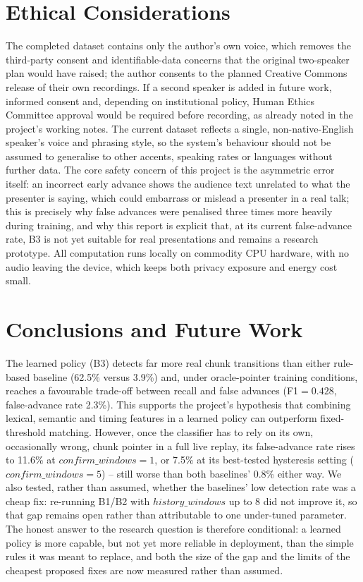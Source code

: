 \documentclass[conference,a4paper]{IEEEtran}
\begin{document}
\section{Ethical Considerations}
The completed dataset contains only the author's own voice, which removes the third-party consent and identifiable-data concerns that the original two-speaker plan would have raised; the author consents to the planned Creative Commons release of their own recordings. If a second speaker is added in future work, informed consent and, depending on institutional policy, Human Ethics Committee approval would be required before recording, as already noted in the project's working notes. The current dataset reflects a single, non-native-English speaker's voice and phrasing style, so the system's behaviour should not be assumed to generalise to other accents, speaking rates or languages without further data. The core safety concern of this project is the asymmetric error itself: an incorrect early advance shows the audience text unrelated to what the presenter is saying, which could embarrass or mislead a presenter in a real talk; this is precisely why false advances were penalised three times more heavily during training, and why this report is explicit that, at its current false-advance rate, B3 is not yet suitable for real presentations and remains a research prototype. All computation runs locally on commodity CPU hardware, with no audio leaving the device, which keeps both privacy exposure and energy cost small.

\section{Conclusions and Future Work}
\label{sec:conclusion}
The learned policy (B3) detects far more real chunk transitions than either rule-based baseline (62.5\% versus 3.9\%) and, under oracle-pointer training conditions, reaches a favourable trade-off between recall and false advances (F1\(=0.428\), false-advance rate 2.3\%). This supports the project's hypothesis that combining lexical, semantic and timing features in a learned policy can outperform fixed-threshold matching. However, once the classifier has to rely on its own, occasionally wrong, chunk pointer in a full live replay, its false-advance rate rises to 11.6\% at \(confirm\_windows=1\), or 7.5\% at its best-tested hysteresis setting (\(confirm\_windows=5\)) -- still worse than both baselines' 0.8\% either way. We also tested, rather than assumed, whether the baselines' low detection rate was a cheap fix: re-running B1/B2 with \(history\_windows\) up to 8 did not improve it, so that gap remains open rather than attributable to one under-tuned parameter. The honest answer to the research question is therefore conditional: a learned policy is more capable, but not yet more reliable in deployment, than the simple rules it was meant to replace, and both the size of the gap and the limits of the cheapest proposed fixes are now measured rather than assumed.
\end{document}
